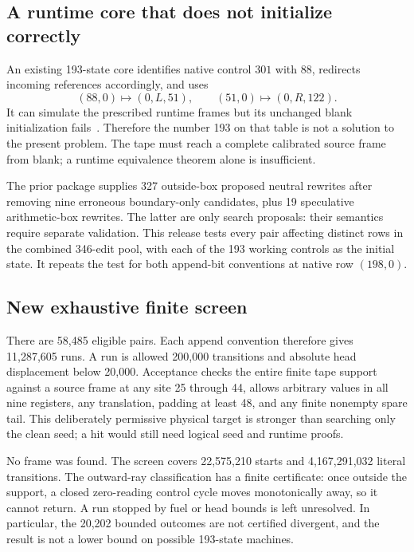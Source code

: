 \documentclass[11pt,letterpaper]{article}
\begin{document}
\subsection{A runtime core that does not initialize correctly}

An existing 193-state core identifies native control $301$ with $88$, redirects incoming references accordingly, and uses
\[
       (88,0)\mapsto(0,L,51),\qquad
       (51,0)\mapsto(0,R,122).
\]
It can simulate the prescribed runtime frames but its unchanged blank initialization fails~\cite{runtime193}. Therefore the number 193 on that table is not a solution to the present problem. The tape must reach a complete calibrated source frame from blank; a runtime equivalence theorem alone is insufficient.

The prior package supplies 327 outside-box proposed neutral rewrites after removing nine erroneous boundary-only candidates, plus 19 speculative arithmetic-box rewrites. The latter are only search proposals: their semantics require separate validation. This release tests every pair affecting distinct rows in the combined 346-edit pool, with each of the 193 working controls as the initial state. It repeats the test for both append-bit conventions at native row $(198,0)$.

\subsection{New exhaustive finite screen}

There are 58,485 eligible pairs. Each append convention therefore gives 11,287,605 runs. A run is allowed 200,000 transitions and absolute head displacement below 20,000. Acceptance checks the entire finite tape support against a source frame at any site 25 through 44, allows arbitrary values in all nine registers, any translation, padding at least 48, and any finite nonempty spare tail. This deliberately permissive physical target is stronger than searching only the clean seed; a hit would still need logical seed and runtime proofs.



No frame was found. The screen covers 22,575,210 starts and 4,167,291,032 literal transitions. The outward-ray classification has a finite certificate: once outside the support, a closed zero-reading control cycle moves monotonically away, so it cannot return. A run stopped by fuel or head bounds is left unresolved. In particular, the 20,202 bounded outcomes are not certified divergent, and the result is not a lower bound on possible 193-state machines.
\end{document}
